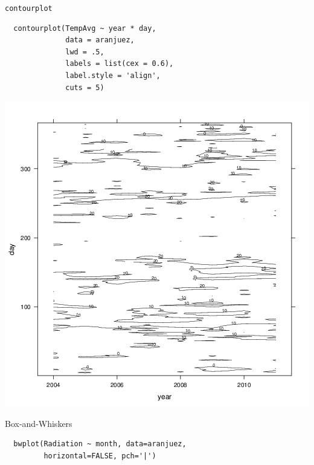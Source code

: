 \documentclass[xcolor={usenames,svgnames,dvipsnames}]{beamer}
\begin{document}
\begin{frame}[fragile,label=sec-3-38]{\texttt{contourplot}}
 \lstset{language=R,label= ,caption= ,numbers=none}
\begin{lstlisting}
  contourplot(TempAvg ~ year * day,
              data = aranjuez,
              lwd = .5,
              labels = list(cex = 0.6),
              label.style = 'align',
              cuts = 5)
\end{lstlisting}
\end{frame}

\begin{frame}[label=sec-3-39]{}
\includegraphics[width=.9\linewidth]{figs/contourplot.png}
\end{frame}

\begin{frame}[fragile,label=sec-3-40]{Box-and-Whiskers}
 \lstset{language=R,label= ,caption= ,numbers=none}
\begin{lstlisting}
  bwplot(Radiation ~ month, data=aranjuez,
         horizontal=FALSE, pch='|')
\end{lstlisting}
\end{frame}
\end{document}
